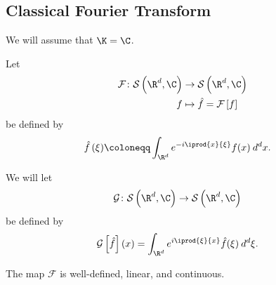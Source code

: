 \documentclass[10pt]{mypackage}
\renewcommand{\coloneq}{\coloneqq}
\begin{document}
\subsection{Classical Fourier Transform}%
We will assume that $\K = \C$.
\begin{definition}
  Let
  \begin{align*}
    \mathcal{F}\colon \mathcal{S}\left( \R^d,\C \right)&\rightarrow \mathcal{S}\left( \R^d,\C \right)\\
    f &\mapsto \hat{f} = \mathcal{F}\left[ f \right]
  \end{align*}
  be defined by
  \begin{align*}
    \hat{f}\left( \xi \right) &\coloneq \int_{\R^d}^{} e^{-i \iprod{x}{\xi}} f(x)\:d^{d}x.
  \end{align*}
\end{definition}
\begin{remark}
  We will let
  \begin{align*}
    \mathcal{G}\colon \mathcal{S}\left( \R^d,\C \right) &\rightarrow \mathcal{S}\left( \R^d,\C \right)
  \end{align*}
  be defined by
  \begin{align*}
    \mathcal{G}\left[ \hat{f} \right]\left( x \right) &= \int_{\R^d}^{} e^{i \iprod{\xi}{x}}\hat{f}(\xi)\:d^{d}\xi.
  \end{align*}
\end{remark}
\begin{theorem}
  The map $ \mathcal{F} $ is well-defined, linear, and continuous.
\end{theorem}
\end{document}
